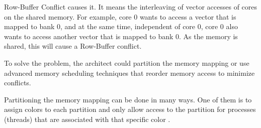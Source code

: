 \documentclass[12pt]{article}
\begin{document}
\begin{enumerate}[label=\alph*.]
Row-Buffer Conflict causes it. It means the interleaving of vector accesses of cores on the shared memory. For example, core 0 wants to access a vector that is mapped to bank 0, and at the same time, independent of core 0, core 0 also wants to access another vector that is mapped to bank 0. As the memory is shared, this will cause a Row-Buffer conflict.


To solve the problem, the architect could partition the memory mapping or use advanced memory scheduling techniques that reorder memory access to minimize conflicts.

Partitioning the memory mapping can be done in many ways. One of them is to assign colors to each partition and only allow access to the partition for processes (threads) that are associated with that specific color \cite{AhrenInvestigatingDB}.
\end{enumerate}


\nocite{*}




\newpage
\end{document}
